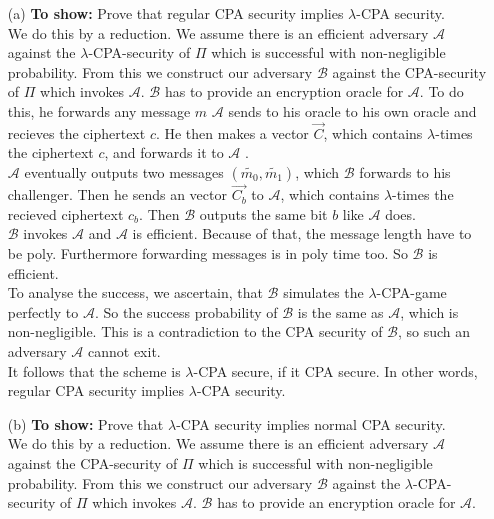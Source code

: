 \begin{itemize}
\item [(a)]
	\textbf{To show:} Prove that regular CPA security implies \(\lambda\)-CPA security.\\
	We do this by a reduction. We assume there is an efficient adversary \(\mathcal{A}\) against the \(\lambda\)-CPA-security of \(\Pi\) which is successful with non-negligible probability. From this we construct our adversary \(\mathcal{B}\) against the CPA-security of \(\Pi\) which invokes \(\mathcal{A}\). \(\mathcal{B}\) has to provide an encryption oracle for \(\mathcal{A}\).
	To do this, he forwards any message \(m\) \(\mathcal{A}\) sends to his oracle to his own oracle and recieves the ciphertext \(c\). He then makes a vector \(\vec{C}\), which contains \(\lambda\)-times the ciphertext \(c\), and forwards it to \(\mathcal{A}\) . \\
	\(\mathcal{A}\) eventually outputs two messages \((\widetilde{m_0}, \widetilde{m_1})\), which \(\mathcal{B}\) forwards to his challenger. Then he sends an vector \(\vec{C_b}\) to \(\mathcal{A}\), which contains  \(\lambda\)-times the recieved ciphertext \(c_b\). Then \(\mathcal{B}\) outputs the same bit \(b\) like \(\mathcal{A}\) does. \\
	\(\mathcal{B}\) invokes \(\mathcal{A}\) and \(\mathcal{A}\) is efficient. Because of that, the message length have to be poly. Furthermore forwarding messages is in poly time too. So \(\mathcal{B}\) is efficient.\\
	To analyse the success, we ascertain, that \(\mathcal{B}\) simulates the \(\lambda\)-CPA-game perfectly to \(\mathcal{A}\). So the success probability of \(\mathcal{B}\) is the same as \(\mathcal{A}\), which is non-negligible. This is a contradiction to the CPA security of \(\mathcal{B}\), so such an adversary \(\mathcal{A}\) cannot exit. \\
	It follows that the scheme is \(\lambda\)-CPA secure, if it CPA secure. In other words, regular CPA security implies \(\lambda\)-CPA security.
\item [(b)]
	\textbf{To show:} Prove that \(\lambda\)-CPA security implies normal CPA security.\\
	We do this by a reduction. We assume there is an efficient adversary \(\mathcal{A}\) against the CPA-security of \(\Pi\) which is successful with non-negligible probability. From this we construct our adversary \(\mathcal{B}\) against the \(\lambda\)-CPA-security of \(\Pi\) which invokes \(\mathcal{A}\). \(\mathcal{B}\) has to provide an encryption oracle for \(\mathcal{A}\).

\end{itemize}
